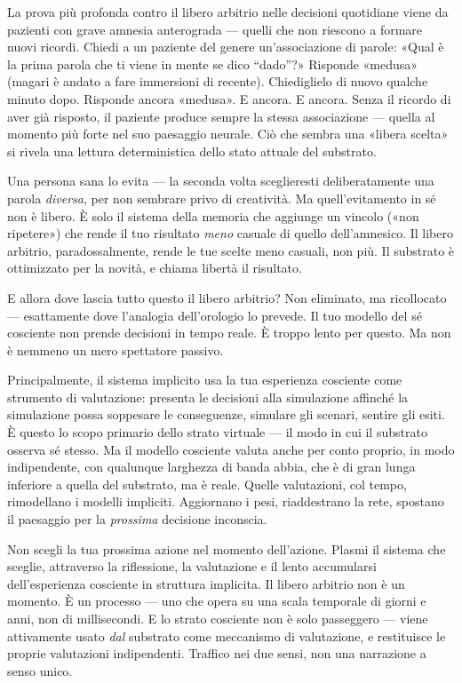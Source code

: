 \documentclass[11pt, twoside, openright]{book}
\begin{document}
La prova più profonda contro il libero arbitrio nelle decisioni quotidiane viene da pazienti con grave amnesia anterograda --- quelli che non riescono a formare nuovi ricordi. Chiedi a un paziente del genere un'associazione di parole: «Qual è la prima parola che ti viene in mente se dico ``dado''?» Risponde «medusa» (magari è andato a fare immersioni di recente). Chiediglielo di nuovo qualche minuto dopo. Risponde ancora «medusa». E ancora. E ancora. Senza il ricordo di aver già risposto, il paziente produce sempre la stessa associazione --- quella al momento più forte nel suo paesaggio neurale. Ciò che sembra una «libera scelta» si rivela una lettura deterministica dello stato attuale del substrato.

Una persona sana lo evita --- la seconda volta sceglieresti deliberatamente una parola \textit{diversa}, per non sembrare privo di creatività. Ma quell'evitamento in sé non è libero. È solo il sistema della memoria che aggiunge un vincolo («non ripetere») che rende il tuo risultato \textit{meno} casuale di quello dell'amnesico. Il libero arbitrio, paradossalmente, rende le tue scelte meno casuali, non più. Il substrato è ottimizzato per la novità, e chiama libertà il risultato.

E allora dove lascia tutto questo il libero arbitrio? Non eliminato, ma ricollocato --- esattamente dove l'analogia dell'orologio lo prevede. Il tuo modello del sé cosciente non prende decisioni in tempo reale. È troppo lento per questo. Ma non è nemmeno un mero spettatore passivo.

Principalmente, il sistema implicito usa la tua esperienza cosciente come strumento di valutazione: presenta le decisioni alla simulazione affinché la simulazione possa soppesare le conseguenze, simulare gli scenari, sentire gli esiti. È questo lo scopo primario dello strato virtuale --- il modo in cui il substrato osserva sé stesso. Ma il modello cosciente valuta anche per conto proprio, in modo indipendente, con qualunque larghezza di banda abbia, che è di gran lunga inferiore a quella del substrato, ma è reale. Quelle valutazioni, col tempo, rimodellano i modelli impliciti. Aggiornano i pesi, riaddestrano la rete, spostano il paesaggio per la \textit{prossima} decisione inconscia.

Non scegli la tua prossima azione nel momento dell'azione. Plasmi il sistema che sceglie, attraverso la riflessione, la valutazione e il lento accumularsi dell'esperienza cosciente in struttura implicita. Il libero arbitrio non è un momento. È un processo --- uno che opera su una scala temporale di giorni e anni, non di millisecondi. E lo strato cosciente non è solo passeggero --- viene attivamente usato \textit{dal} substrato come meccanismo di valutazione, e restituisce le proprie valutazioni indipendenti. Traffico nei due sensi, non una narrazione a senso unico.
\end{document}
